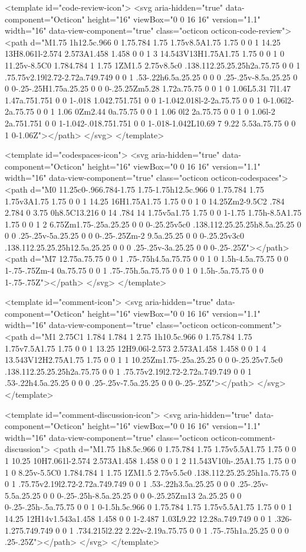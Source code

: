 <template id="code-review-icon">
  <svg aria-hidden="true" data-component="Octicon" height="16" viewBox="0 0 16 16" version="1.1" width="16" data-view-component="true" class="octicon octicon-code-review">
    <path d="M1.75 1h12.5c.966 0 1.75.784 1.75 1.75v8.5A1.75 1.75 0 0 1 14.25 13H8.061l-2.574 2.573A1.458 1.458 0 0 1 3 14.543V13H1.75A1.75 1.75 0 0 1 0 11.25v-8.5C0 1.784.784 1 1.75 1ZM1.5 2.75v8.5c0 .138.112.25.25.25h2a.75.75 0 0 1 .75.75v2.19l2.72-2.72a.749.749 0 0 1 .53-.22h6.5a.25.25 0 0 0 .25-.25v-8.5a.25.25 0 0 0-.25-.25H1.75a.25.25 0 0 0-.25.25Zm5.28 1.72a.75.75 0 0 1 0 1.06L5.31 7l1.47 1.47a.751.751 0 0 1-.018 1.042.751.751 0 0 1-1.042.018l-2-2a.75.75 0 0 1 0-1.06l2-2a.75.75 0 0 1 1.06 0Zm2.44 0a.75.75 0 0 1 1.06 0l2 2a.75.75 0 0 1 0 1.06l-2 2a.751.751 0 0 1-1.042-.018.751.751 0 0 1-.018-1.042L10.69 7 9.22 5.53a.75.75 0 0 1 0-1.06Z"></path>
</svg>
</template>

<template id="codespaces-icon">
  <svg aria-hidden="true" data-component="Octicon" height="16" viewBox="0 0 16 16" version="1.1" width="16" data-view-component="true" class="octicon octicon-codespaces">
    <path d="M0 11.25c0-.966.784-1.75 1.75-1.75h12.5c.966 0 1.75.784 1.75 1.75v3A1.75 1.75 0 0 1 14.25 16H1.75A1.75 1.75 0 0 1 0 14.25Zm2-9.5C2 .784 2.784 0 3.75 0h8.5C13.216 0 14 .784 14 1.75v5a1.75 1.75 0 0 1-1.75 1.75h-8.5A1.75 1.75 0 0 1 2 6.75Zm1.75-.25a.25.25 0 0 0-.25.25v5c0 .138.112.25.25.25h8.5a.25.25 0 0 0 .25-.25v-5a.25.25 0 0 0-.25-.25Zm-2 9.5a.25.25 0 0 0-.25.25v3c0 .138.112.25.25.25h12.5a.25.25 0 0 0 .25-.25v-3a.25.25 0 0 0-.25-.25Z"></path><path d="M7 12.75a.75.75 0 0 1 .75-.75h4.5a.75.75 0 0 1 0 1.5h-4.5a.75.75 0 0 1-.75-.75Zm-4 0a.75.75 0 0 1 .75-.75h.5a.75.75 0 0 1 0 1.5h-.5a.75.75 0 0 1-.75-.75Z"></path>
</svg>
</template>

<template id="comment-icon">
  <svg aria-hidden="true" data-component="Octicon" height="16" viewBox="0 0 16 16" version="1.1" width="16" data-view-component="true" class="octicon octicon-comment">
    <path d="M1 2.75C1 1.784 1.784 1 2.75 1h10.5c.966 0 1.75.784 1.75 1.75v7.5A1.75 1.75 0 0 1 13.25 12H9.06l-2.573 2.573A1.458 1.458 0 0 1 4 13.543V12H2.75A1.75 1.75 0 0 1 1 10.25Zm1.75-.25a.25.25 0 0 0-.25.25v7.5c0 .138.112.25.25.25h2a.75.75 0 0 1 .75.75v2.19l2.72-2.72a.749.749 0 0 1 .53-.22h4.5a.25.25 0 0 0 .25-.25v-7.5a.25.25 0 0 0-.25-.25Z"></path>
</svg>
</template>

<template id="comment-discussion-icon">
  <svg aria-hidden="true" data-component="Octicon" height="16" viewBox="0 0 16 16" version="1.1" width="16" data-view-component="true" class="octicon octicon-comment-discussion">
    <path d="M1.75 1h8.5c.966 0 1.75.784 1.75 1.75v5.5A1.75 1.75 0 0 1 10.25 10H7.061l-2.574 2.573A1.458 1.458 0 0 1 2 11.543V10h-.25A1.75 1.75 0 0 1 0 8.25v-5.5C0 1.784.784 1 1.75 1ZM1.5 2.75v5.5c0 .138.112.25.25.25h1a.75.75 0 0 1 .75.75v2.19l2.72-2.72a.749.749 0 0 1 .53-.22h3.5a.25.25 0 0 0 .25-.25v-5.5a.25.25 0 0 0-.25-.25h-8.5a.25.25 0 0 0-.25.25Zm13 2a.25.25 0 0 0-.25-.25h-.5a.75.75 0 0 1 0-1.5h.5c.966 0 1.75.784 1.75 1.75v5.5A1.75 1.75 0 0 1 14.25 12H14v1.543a1.458 1.458 0 0 1-2.487 1.03L9.22 12.28a.749.749 0 0 1 .326-1.275.749.749 0 0 1 .734.215l2.22 2.22v-2.19a.75.75 0 0 1 .75-.75h1a.25.25 0 0 0 .25-.25Z"></path>
</svg>
</template>

